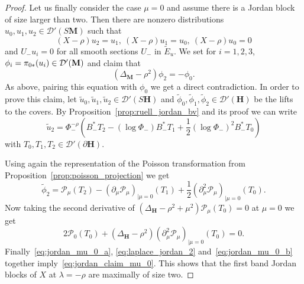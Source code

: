 \documentclass[10pt]{amsart}
\theoremstyle{definition}
\newcommand{\bfh}{\mathbf{H}}
\newcommand{\bfm}{\mathbf{M}}
\newcommand{\pl}{\partial}
\newcommand{\til}{\widetilde}
\begin{document}
\begin{proof}
Let us finally consider the case $\mu = 0$ and assume there is a Jordan block of size larger than two. Then there are nonzero distributions $u_0,u_1,u_2 \in \mathcal D'(S{\bfm})$ such that
\[
(X -\rho)u_2= u_1,\:(X -\rho)u_1= u_0,\:(X -\rho)u_0= 0
\]
and $U_- u_{i}=0$ for all smooth sections $U_-$ in $\til{E}_u$. We set for $i=1,2,3$, $\phi_i = \pi_{0*}(u_i)\linebreak\in \mathcal D'({\bfm})$ and claim that
\begin{equation}\label{eq:jordan_claim_mu_0}
\left(\Delta_{\bfm} -\rho^2\right)\phi_2= -\phi_0.
\end{equation}
As above, pairing this equation with $\phi_0$ we get a direct contradiction. In order to prove this claim, let $\til u_0, \til u_1,\til u_2 \in \mathcal D'(S{\bfh})$ and $\til \phi_0, \til \phi_1, \til \phi_2 \in \mathcal D' ({\bfh})$ be the lifts to the covers. By Proposition~\ref{prop:ruell_jordan_bv} and its proof we can write
\[
\til u_2 = \Phi_-^{-\rho}\left(B_-^*T_2 - (\log \Phi_-) B_-^*T_1+ \frac{1}{2} (\log \Phi_-)^2B_-^*T_0\right)
\]
with $T_0, T_1, T_2\in \mathcal D'(\pl{\bfh})$.

Using again the representation of the Poisson transformation from Proposition~\ref{prop:poisson_projection} we get
\begin{equation}\label{eq:jordan_mu_0_a}
\til \phi_2 = \mathcal P_\mu (T_2) - (\partial_\mu \mathcal P_\mu)_{|\mu=0}(T_1) +\frac{1}{2} \left(\partial_\mu^2 \mathcal P_\mu\right)_{|\mu=0}(T_0).
\end{equation}
Now taking the second derivative of $(\Delta_{\bfh} - \rho^2+\mu^2)\mathcal P_\mu(T_0)=0$ at $\mu=0$ we get
\begin{equation}\label{eq:jordan_mu_0_b}
2\mathcal P_0(T_0) + \left(\Delta_{{\bfh}} - \rho^2\right) \left(\partial_\mu^2\mathcal P_\mu\right)_{|\mu=0}(T_0)=0.
\end{equation}
Finally~\eqref{eq:jordan_mu_0_a}, \eqref{eq:laplace_jordan_2} and~\eqref{eq:jordan_mu_0_b} together imply~\eqref{eq:jordan_claim_mu_0}. This shows that the first band Jordan blocks of $X$ at $\lambda=-\rho$ are maximally of size two.


\end{proof}
\end{document}
